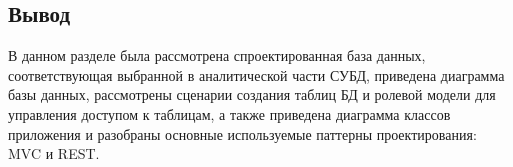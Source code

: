 \subsection*{Вывод}

В данном разделе  была рассмотрена спроектированная база данных, соответствующая выбранной в  аналитической части СУБД, приведена диаграмма базы данных, рассмотрены сценарии создания таблиц БД и ролевой модели для управления доступом к таблицам, а также приведена диаграмма классов приложения и разобраны основные используемые паттерны проектирования: MVC и REST.

